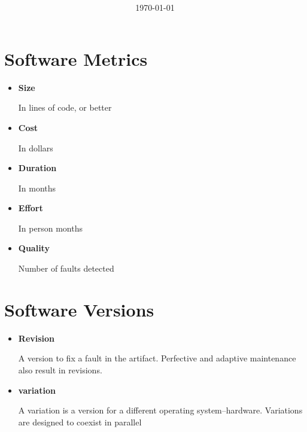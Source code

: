 \documentclass[11pt]{article}
\title{\textbf{\Topic}}
\author{\Name}
\date{\today}
\begin{document}
\maketitle
\noindent\makebox[\linewidth]{\rule[8pt]{5in}{0.5pt}}

\section*{Software Metrics}

\begin{itemize}

	\item \textbf{Size}

	In lines of code, or better
	
	\item \textbf{Cost}
	
	In dollars
	
	\item \textbf{Duration}
	
	In months
	
	\item \textbf{Effort}
	
	In person months
	
	\item \textbf{Quality}
	
	Number of faults detected

\end{itemize}

\section*{Software Versions}

\begin{itemize}

	\item \textbf{Revision}

	A version to fix a fault in the artifact. Perfective and adaptive maintenance also result in revisions.
	
	\item \textbf{variation}
	
	A variation is a version for a different operating system–hardware. Variations are designed to coexist in parallel

\end{itemize}
\end{document}
